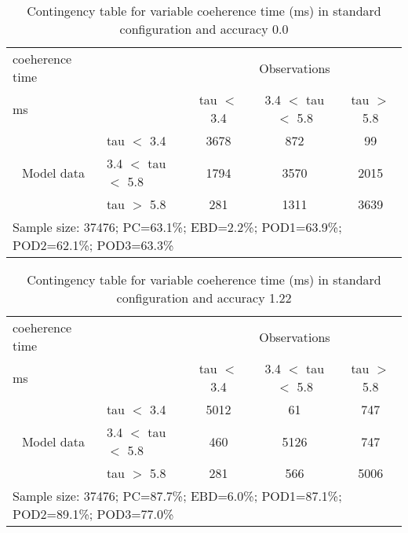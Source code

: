 \documentclass[11pt,english]{article}
\begin{document}
\newpage

\clearpage
\begin{table}[]
\begin{center}
\begin{tabular}{llccc}
\hline
{coeherence time}                                       &                                                    & \multicolumn{3}{c}{Observations}                 \\
{ms}                                       &                             & tau $<$ 3.4   & 3.4 $<$ tau $<$ 5.8 & tau $>$ 5.8 \\
\hline
\multicolumn{1}{c}{\multirow{3}{*}{Model data}}  & tau $<$ 3.4             & 3678                & 872                       & 99              \\
                                                 & 3.4  $<$ tau $<$ 5.8 & 1794                & 3570                       & 2015              \\
                                                 & tau $>$ 5.8             & 281                & 1311                       & 3639              \\
\hline
\multicolumn{5}{l}{Sample size: 37476; PC=63.1\%; EBD=2.2\%; POD1=63.9\%; POD2=62.1\%; POD3=63.3\%}
\end{tabular}
\end{center}
\caption{Contingency table for variable coeherence time (ms) in standard configuration and accuracy 0.0}
\label{tab:contingencytauBEF}
\end{table}
\begin{table}[]
\begin{center}
\begin{tabular}{llccc}
\hline
{coeherence time}                                       &                                                    & \multicolumn{3}{c}{Observations}                 \\
{ms}                                       &                             & tau $<$ 3.4   & 3.4 $<$ tau $<$ 5.8 & tau $>$ 5.8 \\
\hline
\multicolumn{1}{c}{\multirow{3}{*}{Model data}}  & tau $<$ 3.4             & 5012                & 61                       & 747              \\
                                                 & 3.4  $<$ tau $<$ 5.8 & 460                & 5126                       & 747              \\
                                                 & tau $>$ 5.8             & 281                & 566                       & 5006              \\
\hline
\multicolumn{5}{l}{Sample size: 37476; PC=87.7\%; EBD=6.0\%; POD1=87.1\%; POD2=89.1\%; POD3=77.0\%}
\end{tabular}
\end{center}
\caption{Contingency table for variable coeherence time (ms) in standard configuration and accuracy 1.22}
\label{tab:contingencytauBEF}
\end{table}
\end{document}
